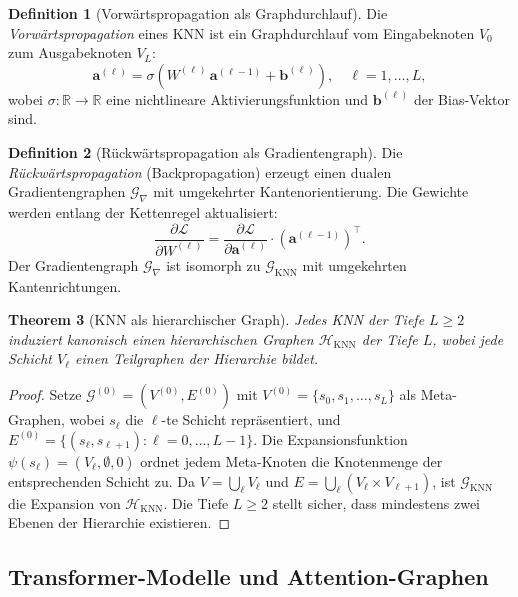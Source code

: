 ﻿\documentclass[12pt,a4paper]{article}
\theoremstyle{plain}
\newtheorem{theorem}{Theorem}[section]
\theoremstyle{definition}
\newtheorem{definition}[theorem]{Definition}
\theoremstyle{remark}
\newcommand{\GG}{\mathcal{G}}
\newcommand{\HH}{\mathcal{H}}
\newcommand{\RR}{\mathbb{R}}
\newcommand{\KNN}{\text{KNN}}
\begin{document}
\begin{definition}[Vorwärtspropagation als Graphdurchlauf]
\label{def:forward}
Die \emph{Vorwärtspropagation} eines KNN ist ein Graphdurchlauf vom Eingabeknoten $V_0$ zum Ausgabeknoten $V_L$:
\[
  \mathbf{a}^{(\ell)} = \sigma\!\left(W^{(\ell)}\, \mathbf{a}^{(\ell-1)} + \mathbf{b}^{(\ell)}\right), \quad \ell = 1, \ldots, L,
\]
wobei $\sigma: \RR \to \RR$ eine nichtlineare Aktivierungsfunktion und $\mathbf{b}^{(\ell)}$ der Bias-Vektor sind.
\end{definition}

\begin{definition}[Rückwärtspropagation als Gradientengraph]
\label{def:backward}
Die \emph{Rückwärtspropagation} (Backpropagation) erzeugt einen dualen Gradientengraphen $\GG_{\nabla}$ mit umgekehrter Kantenorientierung. Die Gewichte werden entlang der Kettenregel aktualisiert:
\[
  \frac{\partial \mathcal{L}}{\partial W^{(\ell)}} = \frac{\partial \mathcal{L}}{\partial \mathbf{a}^{(\ell)}} \cdot \left(\mathbf{a}^{(\ell-1)}\right)^\top.
\]
Der Gradientengraph $\GG_\nabla$ ist isomorph zu $\GG_{\KNN}$ mit umgekehrten Kantenrichtungen.
\end{definition}

\begin{theorem}[KNN als hierarchischer Graph]
\label{thm:knn_hierarchisch}
Jedes KNN der Tiefe $L \geq 2$ induziert kanonisch einen hierarchischen Graphen $\HH_{\KNN}$ der Tiefe $L$, wobei jede Schicht $V_\ell$ einen Teilgraphen der Hierarchie bildet.
\end{theorem}

\begin{proof}
Setze $\GG^{(0)} = (V^{(0)}, E^{(0)})$ mit $V^{(0)} = \{s_0, s_1, \ldots, s_L\}$ als Meta-Graphen, wobei $s_\ell$ die $\ell$-te Schicht repräsentiert, und $E^{(0)} = \{(s_\ell, s_{\ell+1}) : \ell = 0, \ldots, L-1\}$. Die Expansionsfunktion $\psi(s_\ell) = (V_\ell, \emptyset, 0)$ ordnet jedem Meta-Knoten die Knotenmenge der entsprechenden Schicht zu. Da $V = \bigcup_\ell V_\ell$ und $E = \bigcup_\ell (V_\ell \times V_{\ell+1})$, ist $\GG_{\KNN}$ die Expansion von $\HH_{\KNN}$. Die Tiefe $L \geq 2$ stellt sicher, dass mindestens zwei Ebenen der Hierarchie existieren.
\end{proof}

\subsection{Transformer-Modelle und Attention-Graphen}
\end{document}
